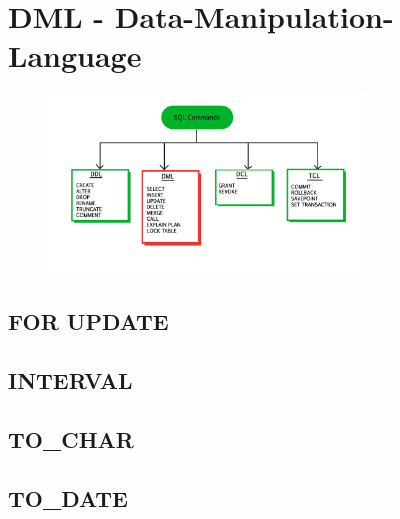 \section[DML]{DML - Data-Manipulation-Language}
\label{sec:dml}

\begin{figure}[h]
  \centering
  \includegraphics[width=0.75\textwidth]{img//sql-commands-dml.jpg}
  \label{img:dml}
\end{figure}

\subsection{FOR UPDATE}
\label{sec:dml.for_update}

\subsection{INTERVAL}
\label{sec:dml.interval}

\subsection{TO\_CHAR}
\label{sec:dml.to_char}

\subsection{TO\_DATE}
\label{sec:dml.to_date}
